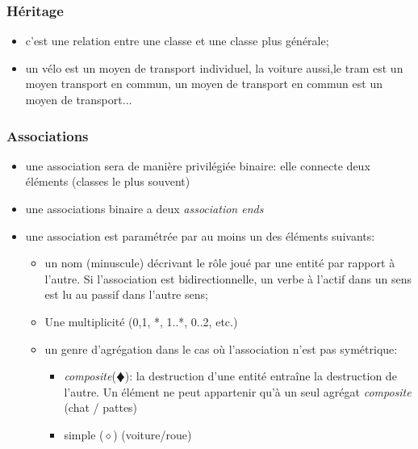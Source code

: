 \documentclass[french]{beamer}
\begin{document}
\begin{frame}\frametitle{Héritage}
  \begin{itemize}
  \item c'est une relation entre une classe et une classe plus générale;
    \item un vélo est un moyen de transport individuel, la voiture aussi,le tram
      est un moyen transport  en commun, un moyen de transport  en commun est un
      moyen de transport...
  \end{itemize}
\end{frame}


\begin{frame}
  \begin{center}
  \end{center}
\end{frame}

\begin{frame}\frametitle{Associations}
  \begin{itemize}
  \item une association sera de  manière privilégiée binaire: elle connecte deux
    éléments (classes le plus souvent)
  \item une associations binaire a deux \textit{association ends}
  \item une association est paramétrée par au moins un des éléments suivants:
    \begin{itemize}
    \item un nom (minuscule) décrivant le rôle joué par une entité par rapport à
      l'autre. Si l'association est bidirectionnelle, un verbe à l'actif dans un
      sens est lu au passif dans l'autre sens;
    \item Une multiplicité (0,1, *, 1..*, 0..2, etc.)
    \item un genre d'agrégation dans le cas où l'association n'est pas symétrique:
      \begin{itemize}
      \item  \textit{composite}($\vardiamondsuit$):  la destruction  d'une  entité
        entraîne la destruction  de l'autre. Un élément ne  peut appartenir qu'à
        un seul agrégat \textit{composite} (chat / pattes)
       \item simple ($\diamond$) (voiture/roue)
      \end{itemize}
      
    \end{itemize}
  \end{itemize}
\end{frame}
\end{document}
